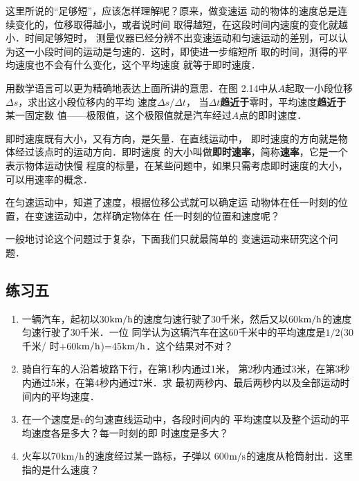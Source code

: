 这里所说的“足够短”，应该怎样理解呢？原来，做变速运
动的物体的速度总是连续变化的，位移取得越小，或者说时间
取得越短，在这段时间内速度的变化就越小．时间足够短时，
测量仪器已经分辨不出变速运动和匀速运动的差别，可以认
为这一小段时间的运动是匀速的．这时，即使进一步缩短所
取的时间，测得的平均速度也不会有什么变化，这个平均速度
就等于即时速度．

\begin{figure}[htp]
\centering
{}
\caption{}
\end{figure}

用数学语言可以更为精确地表达上面所讲的意思．在图
2.14中从$A$起取一小段位移$\Delta s$，求出这小段位移内的平均
速度$\Delta s/\Delta t$， 当$\Delta t$\textbf{趋近于}零时，平均速度\textbf{趋近于}某一固定数
值——极限值，这个极限值就是汽车经过$A$点的即时速度．

    即时速度既有大小，又有方向，是矢量．在直线运动中，
即时速度的方向就是物体经过该点时的运动方向．即时速度
的大小叫做\textbf{即时速率}，简称\textbf{速率}，它是一个表示物体运动快慢
程度的标量，在某些问题中，如果只需考虑即时速度的大小，
可以用速率的概念．

    在匀速运动中，知道了速度，根据位移公式就可以确定运
动物体在任一时刻的位置，在变速运动中，怎样确定物体在
任一时刻的位置和速度呢？

    一般地讨论这个问题过于复杂，下面我们只就最简单的
变速运动来研究这个问题．

\subsection*{练习五}

\begin{enumerate}
    \item 一辆汽车，起初以30$\text{km}/\text{h}$的速度匀速行驶了30千米，然后又以60$\text{km}/\text{h}$的速度匀速行驶了30千米．一位
    同学认为这辆汽车在这60千米中的平均速度是$1/2$(30千米/
    时+60$\text{km}/\text{h}$)=45$\text{km}/\text{h}$．这个结果对不对？
    \item 骑自行车的人沿着坡路下行，在第1秒内通过1米，
    第2秒内通过3米，在第3秒内通过5米，在第4秒内通过7米．求
    最初两秒内、最后两秒内以及全部运动时间内的平均速度．
    \item 在一个速度是$v$的匀速直线运动中，各段时间内的
    平均速度以及整个运动的平均速度各是多大？每一时刻的即
    时速度是多大？
    \item 火车以70$\text{km}/\text{h}$的速度经过某一路标，子弹以
    600$\text{m}/\text{s}$的速度从枪筒射出．这里指的是什么速度？
    
\end{enumerate}


